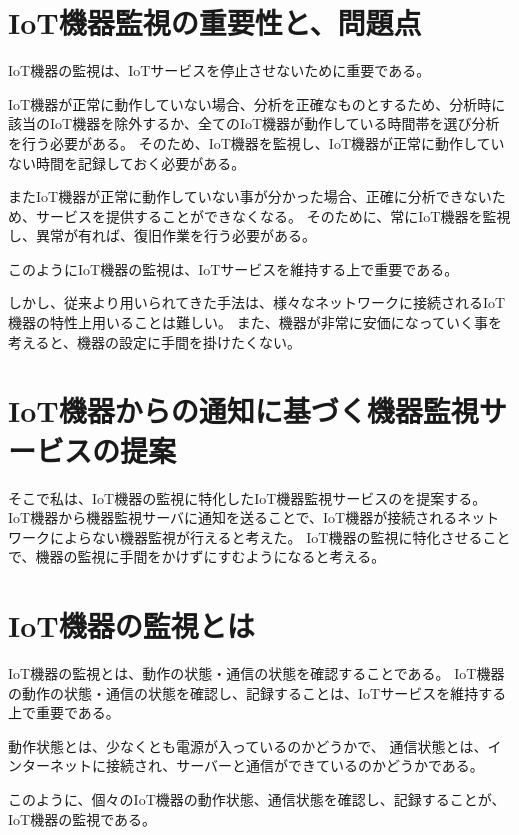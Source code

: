 \section{IoT機器監視の重要性と、問題点}
IoT機器の監視は、IoTサービスを停止させないために重要である。

IoT機器が正常に動作していない場合、分析を正確なものとするため、分析時に該当のIoT機器を除外するか、全てのIoT機器が動作している時間帯を選び分析を行う必要がある。
そのため、IoT機器を監視し、IoT機器が正常に動作していない時間を記録しておく必要がある。

またIoT機器が正常に動作していない事が分かった場合、正確に分析できないため、サービスを提供することができなくなる。
そのために、常にIoT機器を監視し、異常が有れば、復旧作業を行う必要がある。

このようにIoT機器の監視は、IoTサービスを維持する上で重要である。

しかし、従来より用いられてきた手法は、様々なネットワークに接続されるIoT機器の特性上用いることは難しい。
また、機器が非常に安価になっていく事を考えると、機器の設定に手間を掛けたくない。

\section{IoT機器からの通知に基づく機器監視サービスの提案}
そこで私は、IoT機器の監視に特化したIoT機器監視サービスのを提案する。
IoT機器から機器監視サーバに通知を送ることで、IoT機器が接続されるネットワークによらない機器監視が行えると考えた。
IoT機器の監視に特化させることで、機器の監視に手間をかけずにすむようになると考える。

\section{IoT機器の監視とは}%
IoT機器の監視とは、動作の状態・通信の状態を確認することである。
IoT機器の動作の状態・通信の状態を確認し、記録することは、IoTサービスを維持する上で重要である。

動作状態とは、少なくとも電源が入っているのかどうかで、
通信状態とは、インターネットに接続され、サーバーと通信ができているのかどうかである。
\medskip

このように、個々のIoT機器の動作状態、通信状態を確認し、記録することが、IoT機器の監視である。

